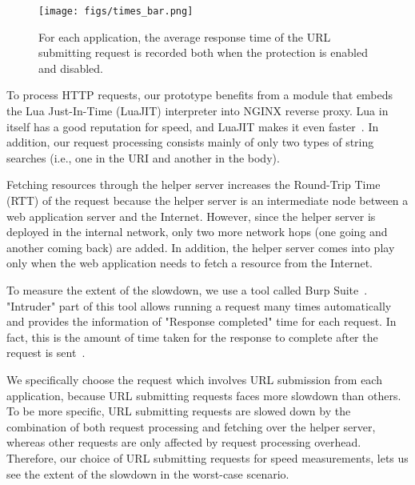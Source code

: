 \begin{figure}[ht]
    \centering
    \texttt{[image: figs/times\_bar.png]}
    \caption{For each application, the average response time of the URL submitting request is recorded both when the protection is enabled and disabled.}
    \label{fig:times_bar}
\end{figure}

To process HTTP requests, our prototype benefits from a module that embeds the Lua Just-In-Time (LuaJIT) interpreter into NGINX reverse proxy. Lua in itself has a good reputation for speed, and LuaJIT makes it even faster~\cite{fast-lua}. In addition, our request processing consists mainly of only two types of string searches (i.e., one in the URI and another in the body).

Fetching resources through the helper server increases the Round-Trip Time (RTT) of the request because the helper server is an intermediate node between a web application server and the Internet. However, since the helper server is deployed in the internal network, only two more network hops (one going and another coming back) are added. In addition, the helper server comes into play only when the web application needs to fetch a resource from the Internet. 


To measure the extent of the slowdown, we use a tool called Burp Suite~\cite{burp_website}. "Intruder" part of this tool allows running a request many times automatically and provides the information of "Response completed" time for each request. In fact, this is the amount of time taken for the response to complete after the request is sent~\cite{burp-docs}.

We specifically choose the request which involves URL submission from each application, because URL submitting requests faces more slowdown than others. To be more specific, URL submitting requests are slowed down by the combination of both request processing and fetching over the helper server, whereas other requests are only affected by request processing overhead. Therefore, our choice of URL submitting requests for speed measurements, lets us see the extent of the slowdown in the worst-case scenario. 

